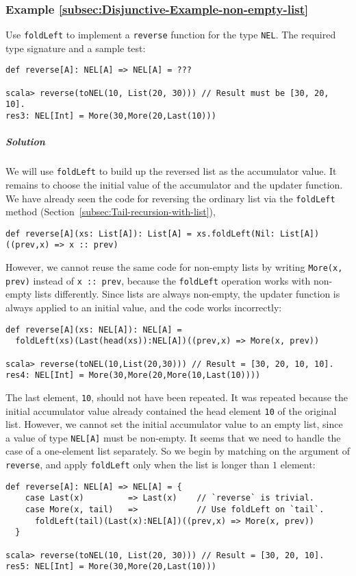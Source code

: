 \subsubsection{Example \label{subsec:Disjunctive-Example-non-empty-list}\ref{subsec:Disjunctive-Example-non-empty-list}}

Use \lstinline!foldLeft! to implement a \lstinline!reverse! function
for the type \lstinline!NEL!. The required type signature and a sample
test:
\begin{lstlisting}
def reverse[A]: NEL[A] => NEL[A] = ???

scala> reverse(toNEL(10, List(20, 30))) // Result must be [30, 20, 10].
res3: NEL[Int] = More(30,More(20,Last(10)))
\end{lstlisting}


\subparagraph{Solution}

We will use \lstinline!foldLeft! to build up the reversed list as
the accumulator value. It remains to choose the initial value of the
accumulator and the updater function. We have already seen the code
for reversing the ordinary list via the \lstinline!foldLeft! method
(Section~\ref{subsec:Tail-recursion-with-list}),
\begin{lstlisting}
def reverse[A](xs: List[A]): List[A] = xs.foldLeft(Nil: List[A])((prev,x) => x :: prev)
\end{lstlisting}
However, we cannot reuse the same code for non-empty lists by writing
\lstinline!More(x, prev)! instead of \lstinline!x :: prev!, because
the \lstinline!foldLeft! operation works with non-empty lists differently.
Since lists are always non-empty, the updater function is always applied
to an initial value, and the code works incorrectly:
\begin{lstlisting}
def reverse[A](xs: NEL[A]): NEL[A] =
  foldLeft(xs)(Last(head(xs)):NEL[A])((prev,x) => More(x, prev))

scala> reverse(toNEL(10,List(20,30))) // Result = [30, 20, 10, 10].
res4: NEL[Int] = More(30,More(20,More(10,Last(10))))
\end{lstlisting}
The last element, \lstinline!10!, should not have been repeated.
It was repeated because the initial accumulator value already contained
the head element \lstinline!10! of the original list. However, we
cannot set the initial accumulator value to an empty list, since a
value of type \lstinline!NEL[A]! must be non-empty. It seems that
we need to handle the case of a one-element list separately. So we
begin by matching on the argument of \lstinline!reverse!, and apply
\lstinline!foldLeft! only when the list is longer than $1$ element:
\begin{lstlisting}
def reverse[A]: NEL[A] => NEL[A] = {
    case Last(x)         => Last(x)    // `reverse` is trivial.
    case More(x, tail)   =>            // Use foldLeft on `tail`.
      foldLeft(tail)(Last(x):NEL[A])((prev,x) => More(x, prev))
  }

scala> reverse(toNEL(10, List(20, 30))) // Result = [30, 20, 10].
res5: NEL[Int] = More(30,More(20,Last(10)))
\end{lstlisting}


